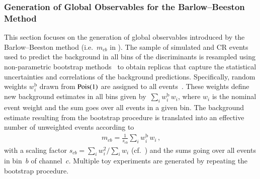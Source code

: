 \subsubsection{Generation of Global Observables for the Barlow--Beeston Method}

This section focuses on the generation of global observables introduced by the
Barlow--Beeston method (i.e.~$m_{cb}$ in
).
%
%
%
The sample of simulated and CR events used to predict the background in all bins
of the discriminants is resampled using non-parametric bootstrap
methods~\cite{10.1214/aos/1176344552,efron1994introduction} to obtain replicas
that capture the statistical uncertainties and correlations of the background
predictions. Specifically, random weights $w_i^{\text{b}}$ drawn from $\operatorname{Pois}(1)$
are assigned to all events~\cite{ATL-PHYS-PUB-2021-011}. These weights define
new background estimates in all bins given
by~$\sum_{i} w_{i}^{\text{b}} \, w_i$, where $w_i$ is the nominal event weight
and the sum goes over all events in a given bin. The background estimate
resulting from the bootstrap procedure is translated into an effective number of
unweighted events according to
\begin{align*}
  m_{cb} = \frac{1}{s_{cb}} \sum_{i} w_{i}^{\text{b}} \, w_i \,\text{,}
\end{align*}
with a scaling factor $s_{cb} = \sum_i w_i^2 / \sum_i w_i$
(cf.~) and the sums going over all events in bin~$b$ of
channel~$c$. Multiple toy experiments are generated by repeating the bootstrap
procedure.

